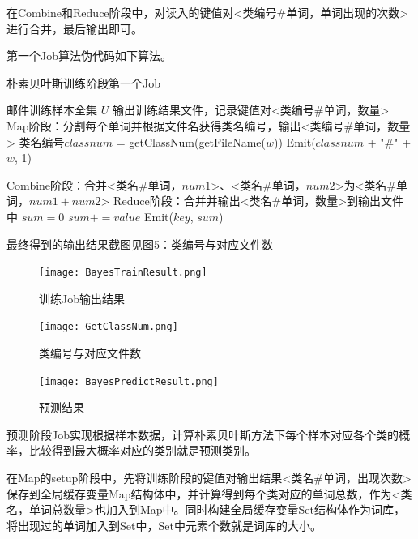 \documentclass[lang=cn,11pt]{elegantpaper}
\begin{document}
在Combine和Reduce阶段中，对读入的键值对<类编号\#单词，单词出现的次数>进行合并，最后输出即可。

第一个Job算法伪代码如下算法。

\begin{algorithm}[H]
  \caption{朴素贝叶斯训练阶段第一个Job}
  \label{alg:Framwork}
  \begin{algorithmic}[1]
    \Require
    邮件训练样本全集 $U$
    \Ensure
    输出训练结果文件，记录键值对<类编号\#单词，数量>
    \State Map阶段：分割每个单词并根据文件名获得类名编号，输出<类编号\#单词，数量>
        \State 类名编号$classnum$ = getClassNum(getFileName($w$))
        \State Emit($classnum$ + "\#" + $w$, 1)
      \EndFor
   \EndFunction

	\State Combine阶段：合并<类名\#单词，$num1$>、<类名\#单词，$num2$>为<类名\#单词，$num1+num2$>
  \State Reduce阶段：合并并输出<类名\#单词，数量>到输出文件中
    \State $sum = 0$
        \State $sum += value$
    \EndFor
    \State Emit($key$, $sum$)
  \EndFunction
  \end{algorithmic}
\end{algorithm}

最终得到的输出结果截图见图5：类编号与对应文件数


\begin{figure}[H]
  \begin{minipage}[t]{0.33\linewidth}
  \centering
  \texttt{[image: BayesTrainResult.png]}
  \caption{训练Job输出结果 \label{fig:BayesTrainResult}}
  \label{fig:side:a}
  \end{minipage}
  \begin{minipage}[t]{0.33\linewidth}
  \centering
  \texttt{[image: GetClassNum.png]}
  \caption{类编号与对应文件数 \label{fig:GetClassNum}}
  \label{fig:side:b}
  \end{minipage}
  \begin{minipage}[t]{0.33\linewidth}
  \centering
  \texttt{[image: BayesPredictResult.png]}
  \caption{预测结果 \label{fig:BayesPredictResult}}
  \label{fig:side:b}
  \end{minipage}
\end{figure}

预测阶段Job实现根据样本数据，计算朴素贝叶斯方法下每个样本对应各个类的概率，比较得到最大概率对应的类别就是预测类别。

在Map的setup阶段中，先将训练阶段的键值对输出结果<类名\#单词，出现次数>保存到全局缓存变量Map结构体中，并计算得到每个类对应的单词总数，作为<类名，单词总数量>也加入到Map中。同时构建全局缓存变量Set结构体作为词库，将出现过的单词加入到Set中，Set中元素个数就是词库的大小。
\end{document}
